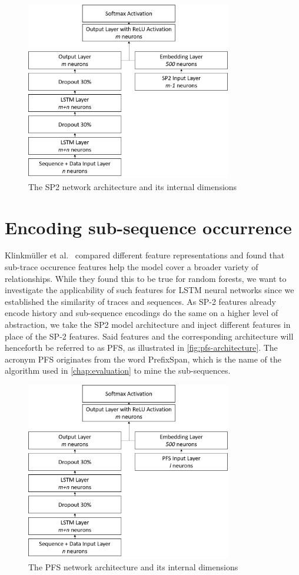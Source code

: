\begin{figure}[ht]
    \centering
    \includegraphics[width=0.8\textwidth]{gfx/sp2-network-architecture.png}
    \caption{The SP2 network architecture and its internal dimensions}
    \label{fig:sp2-architecture}
\end{figure}

\section{Encoding sub-sequence occurrence}
\label{sec:contrib:pfs-inspiration}
Klinkmüller et al.~\cite{klinkmuller2018reliablemonitoring} compared different feature representations and found that sub-trace occurence features help the model cover a broader variety of relationships. While they found this to be true for random forests, we want to investigate the applicability of such features for LSTM neural networks since we established the similarity of traces and sequences. As SP-2 features already encode history and sub-sequence encodings do the same on a higher level of abstraction, we take the SP2 model architecture and inject different features in place of the SP-2 features. Said features and the corresponding architecture will henceforth be referred to as PFS, as illustrated in \autoref{fig:pfs-architecture}. The acronym PFS originates from the word PrefixSpan, which is the name of the algorithm used in \autoref{chap:evaluation} to mine the sub-sequences.

\begin{figure}[ht]
    \centering
    \includegraphics[width=0.8\textwidth]{gfx/pfs-network-architecture.png}
    \caption{The PFS network architecture and its internal dimensions}
    \label{fig:pfs-architecture}
\end{figure}